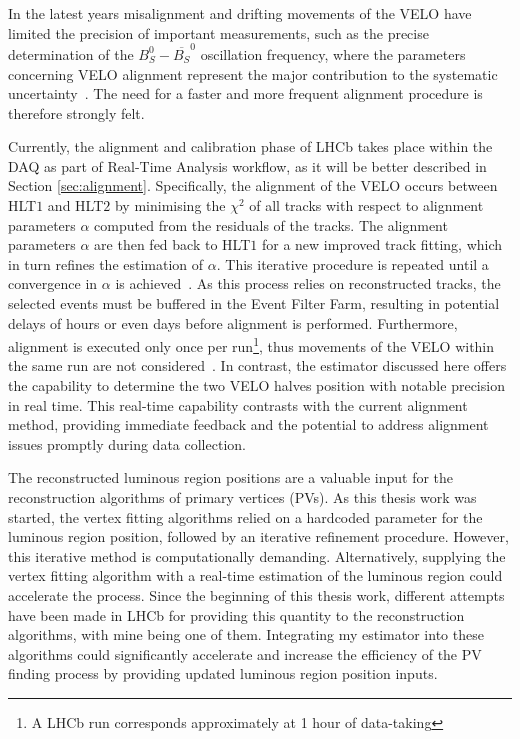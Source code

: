 In the latest years misalignment and drifting movements of the VELO have limited the precision of important measurements, such as the precise determination of the $B_S^0-\overline{B_S} ^0$ oscillation frequency, where the parameters concerning VELO alignment represent the major contribution to the systematic uncertainty~\cite{b0b0soscillation}. The need for a faster and more frequent alignment procedure is therefore strongly felt.  
    
Currently, the alignment and calibration phase of LHCb takes place within the DAQ as part of Real-Time Analysis workflow, as it will be better described in Section \ref{sec:alignment}. Specifically, the alignment of the VELO occurs between HLT$1$ and HLT$2$ by minimising the $\chi^2$ of all tracks with respect to alignment parameters $\alpha$ computed from the residuals of the tracks. The alignment parameters $\alpha$ are then fed back to HLT$1$ for a new improved track fitting, which in turn refines the estimation of $\alpha$. This iterative procedure is repeated until a convergence in $\alpha$ is achieved~\cite{FRUHWIRTH1987444, Frühwirth:803519}. As this process relies on reconstructed tracks, the selected events must be buffered in the Event Filter Farm, resulting in potential delays of hours or even days before alignment is performed. Furthermore, alignment is executed only once per run\footnote{A LHCb run corresponds approximately at 1 hour of data-taking}, thus movements of the VELO within the same run are not considered~\cite{Dziurda:2640712}. In contrast, the estimator discussed here offers the capability to determine the two VELO halves position with notable precision in real time. This real-time capability contrasts with the current alignment method, providing immediate feedback and the potential to address alignment issues promptly during data collection.

The reconstructed luminous region positions are a valuable input for the reconstruction algorithms of primary vertices (PVs). As this thesis work was started, the vertex fitting algorithms relied on a hardcoded parameter for the luminous region position, followed by an iterative refinement procedure. However, this iterative method is computationally demanding. Alternatively, supplying the vertex fitting algorithm with a real-time estimation of the luminous region could accelerate the process. Since the beginning of this thesis work, different attempts have been made in LHCb for providing this quantity to the reconstruction algorithms, with mine being one of them. Integrating my estimator into these algorithms could significantly accelerate and increase the efficiency of the PV finding process by providing updated luminous region position inputs. 


